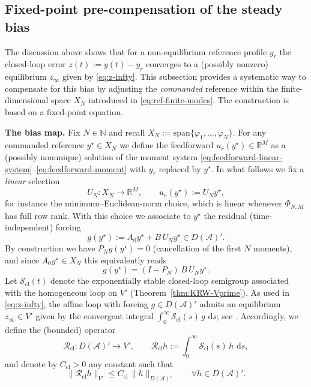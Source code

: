 \documentclass[11pt,a4paper]{article}
\numberwithin{equation}{section}
\theoremstyle{definition}
\newcommand{\1}{\mathbbm{1}}
\newcommand{\dd}{\,\mathrm{d}}
\begin{document}
\subsection{Fixed-point pre-compensation of the steady bias}
\label{subsec:fixed-point-bias}
\noindent
The discussion above shows that for a non-equilibrium reference profile $y_r$ the closed-loop error
$z(t):=y(t)-y_r$ converges to a (possibly nonzero) equilibrium
$z_\infty$ given by \eqref{eq:z-infty}. This subsection provides a systematic way to compensate for this
bias by adjusting the \emph{commanded} reference within the finite-dimensional space $X_N$ introduced in
\eqref{eq:ref-finite-modes}. The construction is based on a fixed-point equation.

\medskip
\noindent\textbf{The bias map.}
Fix $N\in\mathbb{N}$ and recall $X_N:=\mathrm{span}\{\varphi_1,\dots,\varphi_N\}$.
For any commanded reference $y^\star\in X_N$ we define the feedforward $u_r(y^\star)\in\mathbb{R}^M$ as a
(possibly nonunique) solution of the moment system \eqref{eq:feedforward-linear-system}--\eqref{eq:feedforward-moment}
with $y_r$ replaced by $y^\star$. In what follows we fix a \emph{linear} selection
\begin{equation}
\label{eq:UN-def}
U_N:X_N\to\mathbb{R}^M,\qquad u_r(y^\star):=U_N y^\star,
\end{equation}
for instance the minimum--Euclidean-norm choice, which is linear whenever $\Phi_{N,M}$ has full row rank.
With this choice we associate to $y^\star$ the residual (time-independent) forcing
\begin{equation}
\label{eq:g-of-ystar}
g(y^\star):=A_0 y^\star + B\,U_N y^\star \in D(\mathcal{A})'.
\end{equation}
By construction we have $P_N g(y^\star)=0$ (cancellation of the first $N$ moments), and since
$A_0y^\star\in X_N$ this equivalently reads
\begin{equation}
\label{eq:g-is-tail}
g(y^\star)=(I-P_N)\,B\,U_N y^\star .
\end{equation}
\noindent
Let $\mathcal{S}_{\mathrm{cl}}(t)$ denote the exponentially stable closed-loop semigroup associated with the
homogeneous loop on $V'$ (Theorem~\ref{thm:KRW-Vprime}). As used in \eqref{eq:z-infty}, the affine loop with
forcing $g\in D(\mathcal A)'$ admits an equilibrium $z_\infty\in V'$ given by the convergent integral
$\int_0^\infty \mathcal{S}_{\mathrm{cl}}(s)\,g\,\dd s$; see \cite{KunRodWal24-cocv}.
Accordingly, we define the (bounded) operator
\begin{equation}
\label{eq:Rcl-def}
\mathcal{R}_{\mathrm{cl}}:D(\mathcal A)'\to V',\qquad
\mathcal{R}_{\mathrm{cl}}h := \int_0^\infty \mathcal{S}_{\mathrm{cl}}(s)\,h\,\dd s,
\end{equation}
and denote by $C_{\mathrm{cl}}>0$ any constant such that
\begin{equation}
\label{eq:Rcl-bound}
\|\mathcal{R}_{\mathrm{cl}}h\|_{V'} \le C_{\mathrm{cl}}\,\|h\|_{D(\mathcal A)'}\qquad\forall h\in D(\mathcal A)'.
\end{equation}
\end{document}
